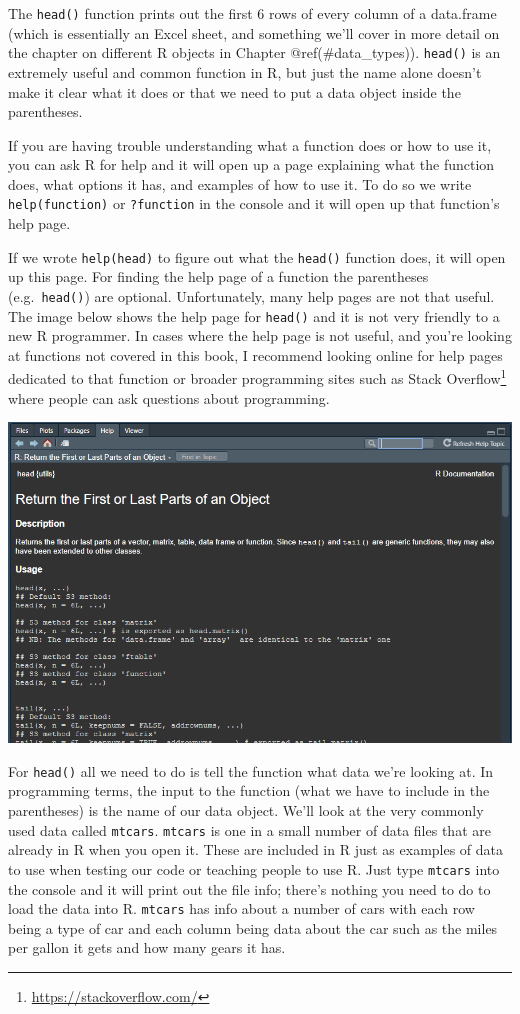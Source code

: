 \documentclass[
]{krantz}
\renewcommand{\href}[2]{#2\footnote{\url{#1}}}
\begin{document}
The \texttt{head()} function prints out the first 6 rows of every column of a data.frame (which is essentially an Excel sheet, and something we'll cover in more detail on the chapter on different R objects in Chapter @ref(\#data\_types)). \texttt{head()} is an extremely useful and common function in R, but just the name alone doesn't make it clear what it does or that we need to put a data object inside the parentheses.

If you are having trouble understanding what a function does or how to use it, you can ask R for help and it will open up a page explaining what the function does, what options it has, and examples of how to use it. To do so we write \texttt{help(function)} or \texttt{?function} in the console and it will open up that function's help page.

If we wrote \texttt{help(head)} to figure out what the \texttt{head()} function does, it will open up this page. For finding the help page of a function the parentheses (e.g.~\texttt{head()}) are optional. Unfortunately, many help pages are not that useful. The image below shows the help page for \texttt{head()} and it is not very friendly to a new R programmer. In cases where the help page is not useful, and you're looking at functions not covered in this book, I recommend looking online for help pages dedicated to that function or broader programming sites such as \href{https://stackoverflow.com/}{Stack Overflow} where people can ask questions about programming.

\includegraphics{images/help_page.PNG}

For \texttt{head()} all we need to do is tell the function what data we're looking at. In programming terms, the input to the function (what we have to include in the parentheses) is the name of our data object. We'll look at the very commonly used data called \texttt{mtcars}. \texttt{mtcars} is one in a small number of data files that are already in R when you open it. These are included in R just as examples of data to use when testing our code or teaching people to use R. Just type \texttt{mtcars} into the console and it will print out the file info; there's nothing you need to do to load the data into R. \texttt{mtcars} has info about a number of cars with each row being a type of car and each column being data about the car such as the miles per gallon it gets and how many gears it has.
\end{document}
